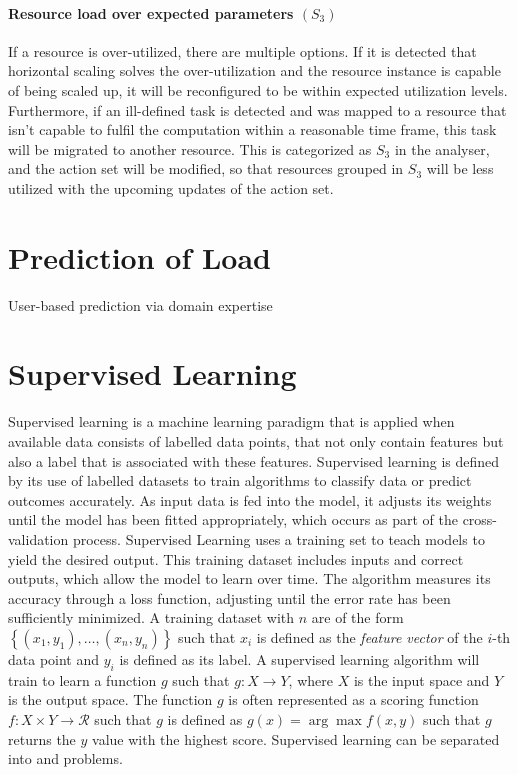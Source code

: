         \paragraph*{Resource load over expected parameters $(S_3)$} 
        If a resource is over-utilized, there are multiple options. If it is detected that horizontal scaling solves the over-utilization and the resource instance is capable of being scaled up, it will be reconfigured to be within expected utilization levels. Furthermore, if an ill-defined task is detected and was mapped to a resource that isn't capable to fulfil the computation within a reasonable time frame, this task will be migrated to another resource. 
        This is categorized as $S_3$ in the analyser, and the action set will be modified, so that resources grouped in $S_3$ will be less utilized with the upcoming updates of the action set. \cite{kimovskiBigDataPipeline2022}


    \section{Prediction of Load}
    \label{sec:prediction-of-load-background}

        User-based prediction via domain expertise

    \section{Supervised Learning}
    \label{sec:supervised-learning}

        Supervised learning is a machine learning paradigm that is applied when available data consists of labelled data points, that not only contain features but also a label that is associated with these features.
        Supervised learning is defined by its use of labelled datasets to train algorithms to classify data or predict outcomes accurately.
        As input data is fed into the model, it adjusts its weights until the model has been fitted appropriately, which occurs as part of the cross-validation process.
        Supervised Learning uses a training set to teach models to yield the desired output.  
        This training dataset includes inputs and correct outputs, which allow the model to learn over time. The algorithm measures its accuracy through a loss function, adjusting until the error rate has been sufficiently minimized.
        A training dataset with $n$ are of the form $\left\{(x_1, y_1), \dots , (x_n, y_n)\right\}$ such that $x_i$ is defined as the \emph{feature vector} of the $i$-th data point and $y_i$ is defined as its label.
        A supervised learning algorithm will train to learn a function $g$ such that $g: X \rightarrow Y$, where $X$ is the input space and $Y$ is the output space.
        The function $g$ is often represented as a scoring function $f: X \times Y \rightarrow \mathcal{R}$ such that $g$ is defined as $g(x) = \arg \max f(x, y)$ such that $g$ returns the $y$ value with the highest score.
        Supervised learning can be separated into  and  problems.

